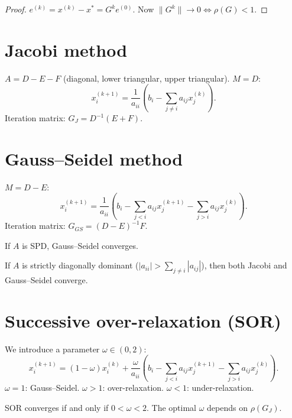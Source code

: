 \begin{proof}
$e^{(k)}=x^{(k)}-x^*=G^k e^{(0)}$. Now $\|G^k\|\to 0 \iff \rho(G)<1$.
\end{proof}

\section{Jacobi method}

\begin{definition}
$A=D-E-F$ (diagonal, lower triangular, upper triangular). $M=D$:
\[
x_i^{(k+1)} = \frac{1}{a_{ii}}\left(b_i-\sum_{j\neq i}a_{ij}x_j^{(k)}\right).
\]
Iteration matrix: $G_J=D^{-1}(E+F)$.
\end{definition}

\section{Gauss--Seidel method}

\begin{definition}
$M=D-E$:
\[
x_i^{(k+1)} = \frac{1}{a_{ii}}\left(b_i-\sum_{j<i}a_{ij}x_j^{(k+1)}-\sum_{j>i}a_{ij}x_j^{(k)}\right).
\]
Iteration matrix: $G_{GS}=(D-E)^{-1}F$.
\end{definition}

\begin{theorem}
If $A$ is SPD, Gauss--Seidel converges.
\end{theorem}

\begin{theorem}
If $A$ is strictly diagonally dominant ($|a_{ii}|>\sum_{j\neq i}|a_{ij}|$), then both Jacobi and Gauss--Seidel converge.
\end{theorem}

\section{Successive over-relaxation (SOR)}

\begin{definition}
We introduce a parameter $\omega\in(0,2)$:
\[
x_i^{(k+1)} = (1-\omega)x_i^{(k)} + \frac{\omega}{a_{ii}}\left(b_i-\sum_{j<i}a_{ij}x_j^{(k+1)}-\sum_{j>i}a_{ij}x_j^{(k)}\right).
\]
$\omega=1$: Gauss--Seidel. $\omega>1$: over-relaxation. $\omega<1$: under-relaxation.
\end{definition}

\begin{theorem}
SOR converges if and only if $0<\omega<2$. The optimal $\omega$ depends on $\rho(G_J)$.
\end{theorem}

